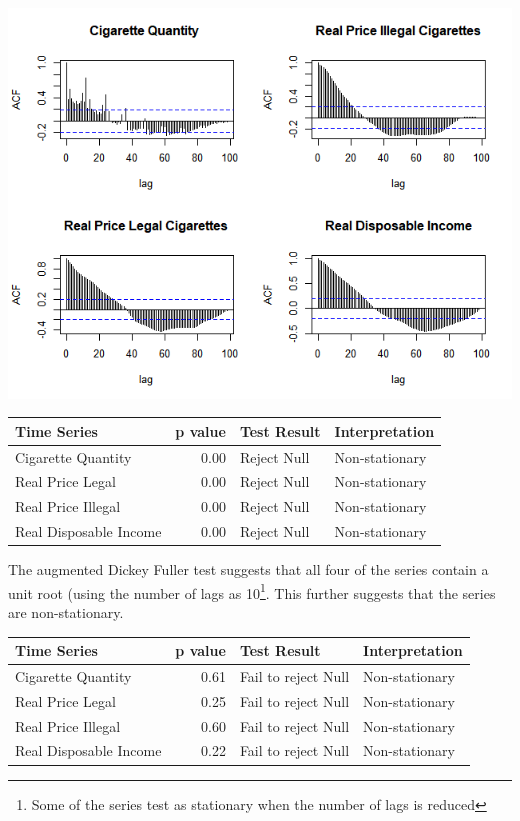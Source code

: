 \documentclass[11pt,preprint, authoryear]{elsarticle}
\let\origfigure\figure
\let\endorigfigure\endfigure
\renewenvironment{figure}[1][2] {
    \expandafter\origfigure\expandafter[H]
} {
    \endorigfigure
}
\let\origtable\table
\let\endorigtable\endtable
\renewenvironment{table}[1][2] {
    \expandafter\origtable\expandafter[H]
} {
    \endorigtable
}
\numberwithin{equation}{section}
\numberwithin{figure}{section}
\numberwithin{table}{section}
\let\rmarkdownfootnote\footnote%
\def\footnote{\protect\rmarkdownfootnote}
\begin{document}
\begin{figure}
\centering
\includegraphics{img/ACF.png}
\caption{\label{plot2} ACF Plots}
\end{figure}

\begin{table}[H]
\centering
\begin{tabular}{lrll}
  \hline
Time Series & p value & Test Result & Interpretation \\ 
  \hline
Cigarette Quantity & 0.00 & Reject Null & Non-stationary \\ 
  Real Price Legal & 0.00 & Reject Null & Non-stationary \\ 
  Real Price Illegal & 0.00 & Reject Null & Non-stationary \\ 
  Real Disposable Income & 0.00 & Reject Null & Non-stationary \\ 
   \hline
\end{tabular}
\caption{Ljung-Box Test \label{box}} 
\end{table}

The augmented Dickey Fuller test suggests that all four of the series
contain a unit root (using the number of lags as 10\footnote{Some of the
  series test as stationary when the number of lags is reduced}. This
further suggests that the series are non-stationary.

\begin{table}[H]
\centering
\begin{tabular}{lrll}
  \hline
Time Series & p value & Test Result & Interpretation \\ 
  \hline
Cigarette Quantity & 0.61 & Fail to reject Null & Non-stationary \\ 
  Real Price Legal & 0.25 & Fail to reject Null & Non-stationary \\ 
  Real Price Illegal & 0.60 & Fail to reject Null & Non-stationary \\ 
  Real Disposable Income & 0.22 & Fail to reject Null & Non-stationary \\ 
   \hline
\end{tabular}
\caption{Augmented Dickey-Fuller Test \label{adf}} 
\end{table}
\end{document}
